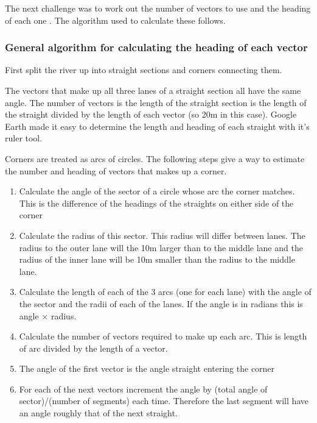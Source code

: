       The next challenge was to work out the number of vectors to use and the heading of each one . The algorithm used to calculate these follows. 
      
      \subsubsection{General algorithm for calculating the heading of each vector}
      First split the river up into straight sections and corners connecting them. 
      
      The vectors that make up all three lanes of a straight section all have the same angle. The number of vectors is the length of the straight section is the length of the straight divided by the length of each vector (so 20m in this case). Google Earth made it easy to determine the length and heading of each straight with it's ruler tool.
      
      Corners are treated as arcs of circles. The following steps give a way to estimate the number and heading of  vectors that makes up a corner.
      
      \begin{enumerate}
        \item Calculate the angle of the sector of a circle whose arc the corner matches. This is the difference of the headings of the straights on either side of the corner
        
        \item Calculate the radius of this sector. This radius will differ between lanes. The radius to the outer lane will the 10m larger than to the middle lane and the radius of the inner lane will be 10m smaller than the radius to the middle lane. 
        
        \item Calculate the length of each of the 3 arcs (one for each lane) with the angle of the sector and the radii of each of the lanes. If the angle is in radians this is angle $\times$ radius.
        
        \item Calculate the number of vectors required to make up each arc. This is length of arc divided by the length of a vector. 
        
        \item The angle of the first vector is the angle straight entering the corner
        
        \item For each of the next vectors increment the angle by (total angle of sector)/(number of segments) each time. Therefore the last segment will have an angle roughly that of the next straight.
      \end{enumerate}
      
